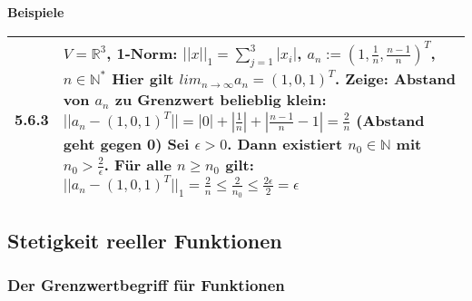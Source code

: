 \noindent
\textbf{Beispiele}
\begin{table}[H]
\begin{tabularx}{\textwidth}{X m{16cm}}
    \toprule

    5.6.3 & $V = \mathbb{R}^3$, 1-Norm: $||x||_1 = \sum^3_{j=1} |x_i|$, $a_n := (1, \frac{1}{n}, \frac{n-1}{n})^T$, $n \in \mathbb{N^*}$ \hfill \break
            Hier gilt $lim_{n \rightarrow \infty} a_n = (1,0,1)^T$. Zeige: Abstand von $a_n$ zu Grenzwert belieblig klein: \hfill \break
            $||a_n - (1,0,1)^T|| = |0| + |\frac{1}{n}| + |\frac{n-1}{n}-1| = \frac{2}{n}$ (Abstand geht gegen 0) \hfill \break
            Sei $\epsilon > 0$. Dann existiert $n_0 \in \mathbb{N}$ mit $n_0 > \frac{2}{\epsilon}$. Für alle $n \geq n_0$ gilt: \hfill \break
            $||a_n - (1,0,1)^T||_1 = \frac{2}{n} \leq \frac{2}{n_0} \leq \frac{2\epsilon}{2} = \epsilon$ \\

    \bottomrule
\end{tabularx}
\end{table}

\subsection{Stetigkeit reeller Funktionen}
\subsubsection{Der Grenzwertbegriff für Funktionen}


